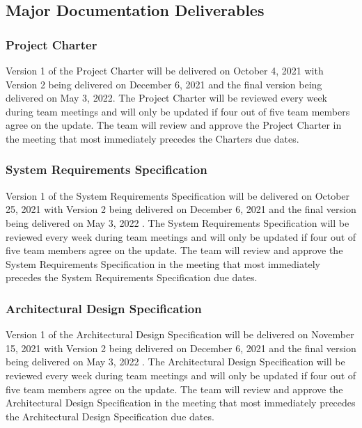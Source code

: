 
\subsection{Major Documentation Deliverables}
\subsubsection{Project Charter}
Version 1 of the Project Charter will be delivered on October 4, 2021 with Version 2 being delivered on December 6, 2021 and the final version being delivered on  May 3, 2022. The Project Charter will be reviewed every week during team meetings and will only be updated if four out of five team members agree on the update. The team will review and approve the Project Charter in the meeting that most immediately precedes the Charters due dates.

\subsubsection{System Requirements Specification}
Version 1 of the System Requirements Specification will be delivered on October 25, 2021 with Version 2 being delivered on December 6, 2021 and the final version being delivered on May 3, 2022 . The System Requirements Specification will be reviewed every week during team meetings and will only be updated if four out of five team members agree on the update. The team will review and approve the System Requirements Specification in the meeting that most immediately precedes the System Requirements Specification due dates.

\subsubsection{Architectural Design Specification}
Version 1 of the Architectural Design Specification will be delivered on November 15, 2021 with Version 2 being delivered on December 6, 2021 and the final version being delivered on May 3, 2022 . The Architectural Design Specification will be reviewed every week during team meetings and will only be updated if four out of five team members agree on the update. The team will review and approve the Architectural Design Specification in the meeting that most immediately precedes the Architectural Design Specification due dates.

